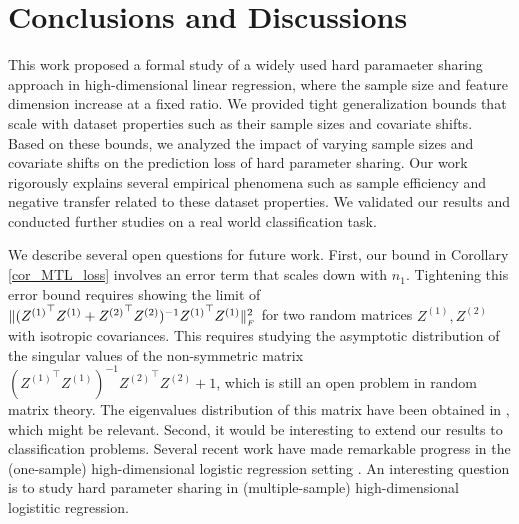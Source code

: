 \section{Conclusions and Discussions}\label{sec_conclude}

This work proposed a formal study of a widely used hard paramaeter sharing approach in high-dimensional linear regression, where the sample size and feature dimension increase at a fixed ratio.
We provided tight generalization bounds that scale with dataset properties such as their sample sizes and covariate shifts.
Based on these bounds, we analyzed the impact of varying sample sizes and covariate shifts on the prediction loss of hard parameter sharing.
Our work rigorously explains several empirical phenomena such as sample efficiency and negative transfer related to these dataset properties.
We validated our results and conducted further studies on a real world classification task.

We describe several open questions for future work.
First, our bound in Corollary \ref{cor_MTL_loss} involves an error term that scales down with $n_1$.
Tightening this error bound requires showing the limit of $\|({Z^{(1)}}^{\top} Z^{(1)} + {Z^{(2)}}^{\top} Z^{(2)})^{-1} {Z^{(1)}}^{\top} Z^{(1)}\|_{_{F}}^2$ for two random matrices $Z^{(1)}, Z^{(2)}$ with isotropic covariances.
This requires studying the asymptotic distribution of the {singular values} of the non-symmetric matrix $({Z^{(1)}}^{\top} Z^{(1)})^{-1}{Z^{(2)}}^{\top} Z^{(2)} + 1$, which is still an open problem in random matrix theory. The eigenvalues distribution of this matrix have been obtained in \cite{Fmatrix}, which might be relevant. 
Second, it would be interesting to extend our results to classification problems.
Several recent work have made remarkable progress in the (one-sample) high-dimensional logistic regression setting \cite{sur2019modern}.
An interesting question is to study hard parameter sharing in (multiple-sample) high-dimensional logistitic regression.
